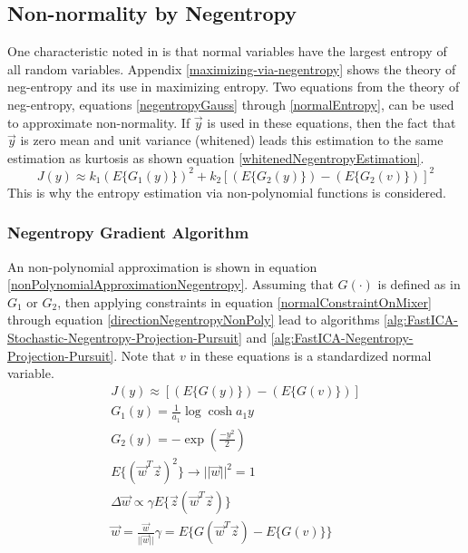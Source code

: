 \documentclass[12pt ]{article}
\begin{document}
\subsection{Non-normality by Negentropy}
One characteristic noted in 
\cite[94]{appo-ica-book} is that normal variables have the largest entropy of all random variables.  Appendix \ref{maximizing-via-negentropy} shows the theory of neg-entropy and its use in maximizing entropy. Two equations from the theory of neg-entropy, equations \ref{negentropyGauss} through \ref{normalEntropy}, can be used to approximate non-normality.  If $\vec{y}$ is used in these equations, then the fact that $\vec{y}$ is zero mean and unit variance (whitened) leads this estimation to the same estimation as kurtosis as shown equation \ref{whitenedNegentropyEstimation}.
\begin{equation}
J(y) \approx k_1 ( E\{ G_1 (y)\} )^2 + k_2 [(E \{G_2 (y)\}) - (E \{G_2 (v)\}) ]^2 \label{whitenedNegentropyEstimation}
\end{equation}
This is why the entropy estimation via non-polynomial functions is considered.  %

\subsubsection{Negentropy Gradient Algorithm}
An non-polynomial approximation is shown in equation \ref{nonPolynomialApproximationNegentropy}.  Assuming that $G(\cdot)$ is defined as in $G_1$ or $G_2$, then applying constraints in equation \ref{normalConstraintOnMixer} through equation \ref{directionNegentropyNonPoly} lead to algorithms \ref{alg:FastICA-Stochastic-Negentropy-Projection-Pursuit} and \ref{alg:FastICA-Negentropy-Projection-Pursuit}.  Note that $v$ in these equations is a standardized normal variable.
\begin{eqnarray}
	J(y) \approx [(E \{G (y)\}) - (E \{G (v)\}) ] \label{nonPolynomialApproximationNegentropy} \\
G_1 (y) = \frac{1}{a_1} \log \cosh a_1 y \\
G_2 (y) = -\exp (\frac{-y^2}{2}) \\
E\{ (\vec{w}^T \vec{z} )^2 \} \to ||\vec{w}||^2 = 1 \label{normalConstraintOnMixer}\\ 
\Delta \vec{w} \propto \gamma E \{ \vec{z} (\vec{w}^T \vec{z}) \} \\
\vec{w} = \frac{\vec{w}}{||\vec{w}||}
\gamma = E \{G(\vec{w}^T \vec{z}) - E \{ G(v) \} \}  \label{directionNegentropyNonPoly}
\end{eqnarray}
% 
\end{document}
